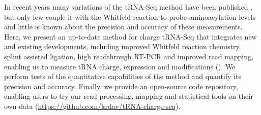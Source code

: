\documentclass[9pt,lineno]{elife}
\begin{document}
In recent years many variations of the tRNA-Seq method have been published \citep{Wang2021-fc, Zheng2015-kj, Cozen2015-cx, Shigematsu2017-tv, Erber2020-qg, Thomas2021-fi, Lucas2023-vm, Pinkard2020-yd, Warren2021-wt, Yamagami2022-yb}, but only few couple it with the Whitfeld reaction to probe aminoacylation levels \citep{Evans2017-st, Behrens2021-gb, Watkins2022-er} and little is known about the precision and accuracy of these measurements.
Here, we present an up-to-date method for charge tRNA-Seq that integrates new and existing developments, including improved Whitfeld reaction chemistry, splint assisted ligation, high readthrough RT-PCR and improved read mapping, enabling us to measure tRNA charge, expression and modifications ().
We perform tests of the quantitative capabilities of the method and quantify its precision and accuracy.
Finally, we provide an open-source code repository, enabling users to try our read processing, mapping and statistical tools on their own data (\url{https://github.com/krdav/tRNA-charge-seq}).
\end{document}
